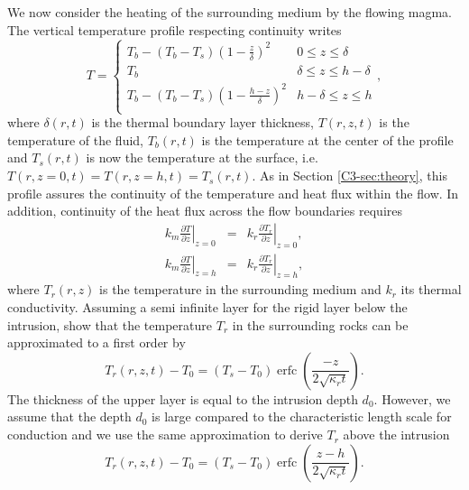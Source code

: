 We now consider  the heating of the surrounding medium  by the flowing
magma.  The vertical temperature profile respecting continuity writes
\begin{equation}
  T=
  \begin{cases}
    T_b - (T_b-T_s)(1-\frac{z}{\delta})^2 & 0 \le z\le \delta \\
    T_b & \delta \le z\le h-\delta \\
    T_b - (T_b-T_s)(1-\frac{h-z}{\delta})^2 & h-\delta \le z\le h\\
  \end{cases},
  \label{C4-Temperature}
\end{equation}
where  $\delta(r,t)$   is  the   thermal  boundary   layer  thickness,
$T(r,z,t)$  is  the  temperature  of  the  fluid,  $T_b(r,t)$  is  the
temperature at  the center of  the profile  and $T_s(r,t)$ is  now the
temperature  at the  surface, i.e.   $T(r,z=0,t)=T(r,z=h,t)=T_s(r,t)$.
As in Section \ref{C3-sec:theory}, this profile assures the continuity
of  the temperature  and  heat  flux within  the  flow.  In  addition,
continuity of the heat flux across the flow boundaries requires
\begin{eqnarray}
  k_m\left.\frac{\partial                                    T}{\partial
  z}\right|_{z=0}&=&k_r\left.\frac{\partial              T_r}{\partial
                     z}\right|_{z=0}  ,\label{C4-Flux1}\\
  k_m\left.\frac{\partial                                  T}{\partial
  z}\right|_{z=h}&=&k_r\left.\frac{\partial            T_r}{\partial
                     z}\right|_{z=h},
                     \label{C4-Flux2}
\end{eqnarray}
where  $T_r(r,z)$ is  the temperature  in the  surrounding medium  and
$k_r$ its  thermal conductivity.  Assuming  a semi infinite  layer for
the rigid layer below  the intrusion, \citet{Carslaw:1959wf} show that
the temperature $T_r$ in the  surrounding rocks can be approximated to
a first order by
\begin{equation}
  T_r(r,z,t)-T_0=(T_{s}-T_0)\operatorname{erfc}{\left(\frac{-z}{2\sqrt{\kappa_r t}}\right)}.
  \label{C4-eq22}
\end{equation}
The  thickness of  the upper  layer is  equal to  the intrusion  depth
$d_0$. However,  we assume that the  depth $d_0$ is large  compared to
the characteristic  length scale  for conduction and  we use  the same
approximation to derive $T_r$ above the intrusion
\begin{equation}
  T_r(r,z,t)-T_0=(T_{s}-T_0)\operatorname{erfc}{\left(\frac{z-h}{2\sqrt{\kappa_r t}}\right)}.
  \label{C4-eq11}
\end{equation}
